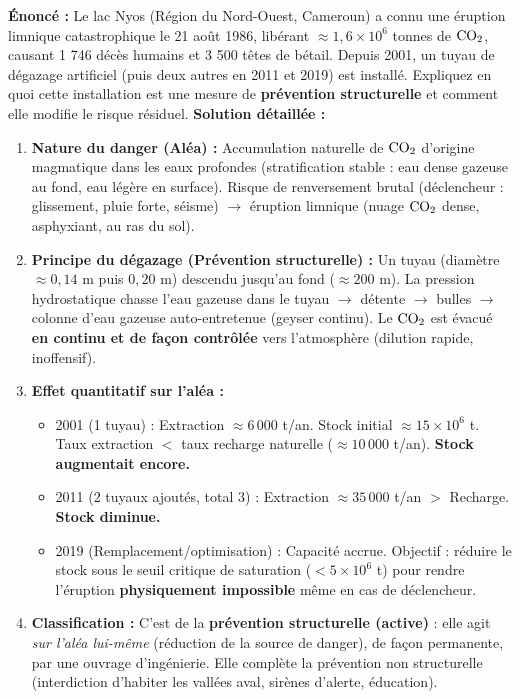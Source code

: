\documentclass[11pt]{article}
\begin{document}
\begin{exoresolu}
\textbf{Énoncé :} Le lac Nyos (Région du Nord-Ouest, Cameroun) a connu une éruption limnique catastrophique le 21 août 1986, libérant $\approx 1,6 \times 10^6$ tonnes de $\ce{CO2}$, causant 1 746 décès humains et 3 500 têtes de bétail. Depuis 2001, un tuyau de dégazage artificiel (puis deux autres en 2011 et 2019) est installé. Expliquez en quoi cette installation est une mesure de \textbf{prévention structurelle} et comment elle modifie le risque résiduel.
\textbf{Solution détaillée :}
\begin{enumerate}
    \item \textbf{Nature du danger (Aléa) :} Accumulation naturelle de $\ce{CO2}$ d'origine magmatique dans les eaux profondes (stratification stable : eau dense gazeuse au fond, eau légère en surface). Risque de renversement brutal (déclencheur : glissement, pluie forte, séisme) $\rightarrow$ éruption limnique (nuage $\ce{CO2}$ dense, asphyxiant, au ras du sol).
    \item \textbf{Principe du dégazage (Prévention structurelle) :} Un tuyau (diamètre $\approx 0,14$ m puis $0,20$ m) descendu jusqu'au fond ($\approx 200$ m). La pression hydrostatique chasse l'eau gazeuse dans le tuyau $\rightarrow$ détente $\rightarrow$ bulles $\rightarrow$ colonne d'eau gazeuse auto-entretenue (geyser continu). Le $\ce{CO2}$ est évacué \textbf{en continu et de façon contrôlée} vers l'atmosphère (dilution rapide, inoffensif).
    \item \textbf{Effet quantitatif sur l'aléa :}
        \begin{itemize}
            \item 2001 (1 tuyau) : Extraction $\approx 6\,000$ t/an. Stock initial $\approx 15 \times 10^6$ t. Taux extraction $<$ taux recharge naturelle ($\approx 10\,000$ t/an). \textbf{Stock augmentait encore.}
            \item 2011 (2 tuyaux ajoutés, total 3) : Extraction $\approx 35\,000$ t/an $>$ Recharge. \textbf{Stock diminue.}
            \item 2019 (Remplacement/optimisation) : Capacité accrue. Objectif : réduire le stock sous le seuil critique de saturation ($< 5 \times 10^6$ t) pour rendre l'éruption \textbf{physiquement impossible} même en cas de déclencheur.
        \end{itemize}
    \item \textbf{Classification :} C'est de la \textbf{prévention structurelle (active)} : elle agit \emph{sur l'aléa lui-même} (réduction de la source de danger), de façon permanente, par une ouvrage d'ingénierie. Elle complète la prévention non structurelle (interdiction d'habiter les vallées aval, sirènes d'alerte, éducation).

\end{enumerate}
\end{exoresolu}
\end{document}
